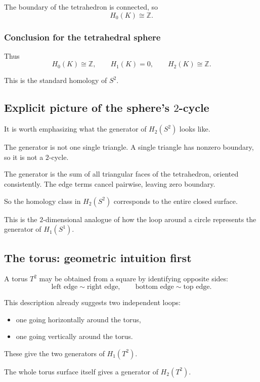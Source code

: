 \documentclass[12pt,a4paper]{article}
\theoremstyle{notespace}
\begin{document}
The boundary of the tetrahedron is connected, so
\[
H_0(K)\cong \mathbb{Z}.
\]

\subsubsection{Conclusion for the tetrahedral sphere}

Thus
\[
H_0(K)\cong \mathbb{Z},
\qquad
H_1(K)=0,
\qquad
H_2(K)\cong \mathbb{Z}.
\]

This is the standard homology of \(S^2\).

\subsection{Explicit picture of the sphere's \texorpdfstring{$2$}{2}-cycle}

It is worth emphasizing what the generator of \(H_2(S^2)\) looks like.

The generator is not one single triangle. A single triangle has nonzero boundary, so it is not a \(2\)-cycle.

The generator is the sum of all triangular faces of the tetrahedron, oriented consistently. The edge terms cancel pairwise, leaving zero boundary.

So the homology class in \(H_2(S^2)\) corresponds to the entire closed surface.

This is the \(2\)-dimensional analogue of how the loop around a circle represents the generator of \(H_1(S^1)\).

\subsection{The torus: geometric intuition first}

A torus \(T^2\) may be obtained from a square by identifying opposite sides:
\[
\text{left edge} \sim \text{right edge},
\qquad
\text{bottom edge} \sim \text{top edge}.
\]

This description already suggests two independent loops:
\begin{itemize}
	\item one going horizontally around the torus,
	\item one going vertically around the torus.
\end{itemize}

These give the two generators of \(H_1(T^2)\).

The whole torus surface itself gives a generator of \(H_2(T^2)\).
\end{document}
